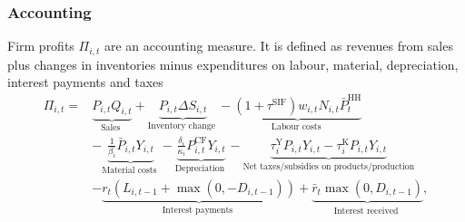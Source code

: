 \subsubsection{Accounting}
\label{Prices}
Firm profits $\Pi_{i,t}$ are an accounting measure. It is defined as revenues from sales plus changes in inventories minus expenditures on labour, material, depreciation, interest payments and taxes
\begin{equation}
\begin{aligned}
\Pi_{i,t}= & \underbrace{P_{i,t} Q_{i,t}}_{\text {Sales }}+\underbrace{P_{i,t} \Delta S_{i,t}}_{\text {Inventory change }}-\underbrace{\left(1+\tau^{\mathrm{SIF}}\right) w_{i,t} N_{i,t} \bar{P}_t^{\mathrm{HH}} }_{\text {Labour costs }} \\
& -\underbrace{\frac{1}{\beta_i} \bar{P}_{i,t} Y_{i,t}}_{\text {Material costs }}-\underbrace{\frac{\delta_i}{\kappa_i} P_{i,t}^{\mathrm{CF}}  Y_{i,t}}_{\text {Depreciation }}-\underbrace{\tau_i^{\mathrm{Y}} P_{i,t} Y_{i,t}-\tau_i^{\mathrm{K}} P_{i,t} Y_{i,t}}_{\text {Net taxes/subsidies on products/production}} \\
& -\underbrace{r_t \left(L_{i,t-1}+\max \left(0,-D_{i,t-1}\right)\right)}_{\text {Interest payments }}+\underbrace{\bar{r}_t  \max \left(0, D_{i,t-1}\right)}_{\text {Interest received }},
\end{aligned}
\end{equation}

